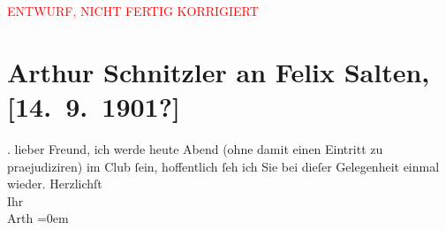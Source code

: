 
\begin{center}
            \textcolor{red}{ENTWURF, NICHT FERTIG KORRIGIERT}
                      \end{center}
            
         
         \renewcommand{\erwaehntePersonen}{Personen: Felix Salten}
         \renewcommand{\erwaehnteInstitutionen}{Institutionen: Wiener Schachclub}
         \renewcommand{\erwaehnteOrte}{Orte: Wien}
         \renewcommand{\erwaehnteWerke}{}
               \section[Arthur Schnitzler an Felix Salten, {[}14. 9. 1901?{]}]{ Arthur Schnitzler an Felix Salten, {[}14. 9. 1901?{]}}\nopagebreak{}\rehead{ }\begin{ledgroupsized}[t]{13cm}\normalsize\beginnumbering \toendnotes[C]{\smallbreak\pagebreak[2]} 
\toendnotes[C]{\smallbreak}\pstart
           \raggedleft{}{\pb}\label{K_L02968-12v}\label{K_L02968-12h}.\pend
           \pstart
           lieber Freund, ich werde heute Abend (ohne damit einen Eintritt zu
               praejudiziren) im Club ſein, hoffentlich ſeh ich
               Sie bei dieſer Gelegenheit einmal wieder. \pend
           \pstart
           Herzlichſt {\\[\baselineskip]}Ihr {\\[\baselineskip]}\spacefill\mbox{Arth}\pend
           \leftskip=0em{}
         
         \endnumbering{}\end{ledgroupsized}\begin{anhang}\end{anhang}\newcommand{\dateiname}{L02968}\newcommand{\titel}{Arthur Schnitzler an Felix Salten, [14. 9. 1901?]}\newcommand{\editorInnen}{Martin Anton Müller und Laura Untner}
      